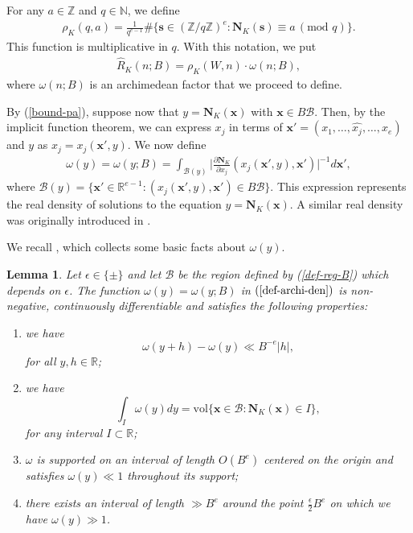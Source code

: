 \documentclass[reqno, 11pt]{amsart}
\newtheorem{lemma}[theorem]{Lemma}
\theoremstyle{definition}
\theoremstyle{definition}
\renewcommand{\mod}{\mathrm{mod}\,}
\newcommand{\RR}{\mathbb{R}}
\newcommand{\BB}{\mathcal{B}}
\newcommand{\sss}{\mathbf{s}}
\newcommand{\xx}{\mathbf{x}}
\newcommand{\pa}{\partial}
\newcommand{\ZZ}{\mathbb{Z}}
\newcommand{\NN}{\mathbb{N}}
\newcommand{\NNN}{\mathbf{N}}
\numberwithin{equation}{section}
\begin{document}
For any $a \in \ZZ$ and $q \in \NN$, we define
\begin{align*}
	\rho_K(q, a) = \frac{1}{q^{e-1}} \# \{ \sss \in (\ZZ / q\ZZ)^e: \NNN_K(\sss) \equiv a \, (\mod \, q)  \}.
\end{align*}
This function is multiplicative in $q$. With this notation, we put 
\begin{align}\label{def-Rh}
	\hat{R}_K(n; B) = \rho_K(W, n) \cdot \omega(n; B),
\end{align}
where $\omega(n; B)$ is an archimedean factor that we proceed to define.

By (\ref{bound-pa}), suppose now that $y = \NNN_K(\xx)$ with $\xx \in B\BB$. Then, by the implicit function theorem, we can express $x_j$ in terms of $\xx' = (x_1, \dots, \widehat{x_j}, \dots, x_e)$ and $y$ as $x_j = x_j(\xx', y)$. We now define
\begin{align}\label{def-archi-den}
	\omega(y) = \omega(y; B) = \int_{\BB(y)} \Big| \frac{\pa \NNN_K}{\pa x_j}(x_j(\xx', y), \xx') \Big|^{-1} d \xx',
\end{align}
where $\BB(y) = \{ \xx' \in \RR^{e-1}: (x_j(\xx', y), \xx') \in B \BB \}$. This expression represents the real density of solutions to the equation $y = \NNN_K(\xx)$. A similar real density was originally introduced in \cite[Lemma 9]{B-HB1}.

We recall \cite[Lemma 7.1]{BST}, which collects some basic facts about $\omega(y)$.

\begin{lemma}\label{lemma-arch}
	Let $\epsilon \in \{\pm\}$ and let $\mathcal{B}$ be the region defined by (\ref{def-reg-B}) which depends on $\epsilon$. The function $\omega(y) = \omega(y; B)$ in $(\ref{def-archi-den})$ is non-negative, continuously differentiable and satisfies the following properties:
	\begin{enumerate}[label=(\roman*)]
		\item we have
		$$\omega(y+h) - \omega(y) \ll B^{-e} |h|,$$
		for all $y, h \in \RR$;
		\item we have
		$$\int_I \omega(y) dy = \mathrm{vol} \{ \xx \in \BB: \NNN_K(\xx) \in I \}, $$
		for any interval $I \subset \RR$;
		\item $\omega$ is supported on an interval of length $O(B^e)$ centered on the origin and satisfies $\omega(y) \ll 1$ throughout its support;
		\item there exists an interval of length $\gg B^e$ around the point $\frac{\epsilon}{2} B^e$ on which we have $\omega(y) \gg 1$.
	\end{enumerate}
\end{lemma}
\end{document}
